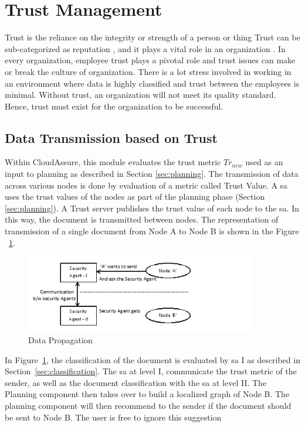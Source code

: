 \section{Trust Management}
\label{sec:trust-management}
Trust is the reliance on the integrity or strength of a person or thing
\autocite{Dictionary2013} Trust can be sub-categorized as reputation
, and it plays a vital role in an organization \autocite{Liu2006}. In every organization, employee trust plays
a pivotal role and trust issues can make or break the culture of organization. There is a
lot stress involved in working in an environment where data is highly classified and trust
between the employees is minimal. Without trust, an organization will not meet its
quality standard. Hence, trust must exist for the organization to be successful.

\subsection{Data Transmission based on Trust}
Within CloudAssure, this module evaluates the trust metric \( Tr_{new} \) used
as an input to planning as described in Section \ref{sec:planning}. The transmission of data across various
nodes is done by evaluation of a metric called Trust Value. A \gls{sa} 
uses the trust values of the nodes as part of the planning phase (Section
\ref{sec:planning}). A Trust server publishes the trust value of each node to
the \gls{sa}. In this way, the document is transmitted between
nodes. The representation of transmission of a single document from Node A to Node B is
shown in the Figure ~\ref{fig:DataTransmission}.
\begin{figure}[h!]
    \begin{center}
        \includegraphics[width=0.90\textwidth]{Figures/figure1.png}
        \caption{Data Propagation}
        \label{fig:DataTransmission}
    \end{center}
\end{figure}


In Figure~\ref{fig:DataTransmission}, the classification of the document
is evaluated by \gls{sa} I as described in Section~\ref{sec:classification}. 
The \gls{sa} at level I, communicate the trust metric of the sender, as well as
the document classification with the \gls{sa} at level II. The Planning
component then takes over to build a localized graph of Node B. The planning
component will then recommend to the sender if the document should be sent to
Node B. The user is free to ignore this suggestion

